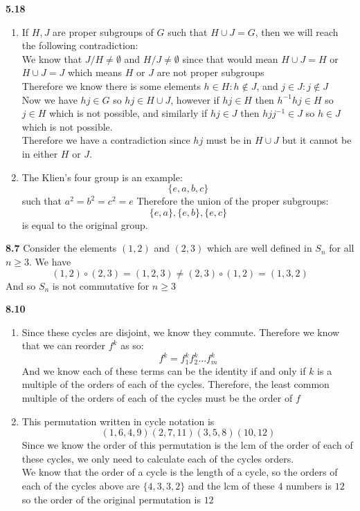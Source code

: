 \documentclass[12pt]{article}
\newenvironment{ques}{\vspace{2 ex}}{\vspace{2 ex}}
\theoremstyle{definition}
\begin{document}
\begin{ques}
	\textbf{5.18} 
		\begin{enumerate}
			\item If $H,J$ are proper subgroups of $G$ such that $H
				\cup J = G$, then we will reach the following
				contradiction:\\
				We know that $J / H \neq \emptyset$ and $H/J
				\neq \emptyset$ since that would mean $H \cup J
				= H$ or $H \cup J = J$ which means $H$ or $J$
				are not proper subgroups\\
				Therefore we know there is some elements $h \in
				H: h \notin J$, and $j \in J: j \notin J$\\
				Now we have $hj \in G$ so $hj \in H \cup J$,
				however if $hj \in H$ then $h^{-1}hj \in H$ so
				$j \in H$ which is not possible, and similarly
				if $hj \in J$ then $hjj^{-1} \in J$ so $h \in
				J$ which is not possible.\\
				Therefore we have a contradiction since $hj$
				must be in $H \cup J$ but it cannot be in
				either $H$ or $J$.

			\item The Klien's four group is an example:
				$$\{e, a, b, c\}$$
				such that $a^2 = b^2 = c^2 = e$
				Therefore the union of the proper subgroups:
				$$\{e, a\}, \{e, b\}, \{e, c\}$$
				is equal to the original group.
		\end{enumerate}
\end{ques}

\begin{ques}
	\textbf{8.7} Consider the elements $(1,2)$ and $(2,3)$ which are well
		defined in $S_n$ for all $n \geq 3$. We have
		$$(1,2) \circ (2,3) = (1,2,3) \neq (2,3) \circ (1,2) = (1,3,2)$$
		And so $S_n$ is not commutative for $n \geq 3$
\end{ques}

\begin{ques}
	\textbf{8.10} 
		\begin{enumerate} 
			\item Since these cycles are disjoint, we know they
				commute. Therefore we know that we can reorder
				$f^k$ as so:
				$$f^k = f_1^kf_2^k\dots f_m^k$$
				And we know each of these terms can be the
				identity if and only if $k$ is a multiple of
				the orders of each of the cycles. Therefore,
				the least common multiple of the orders of each
				of the cycles must be the order of $f$
				
			\item This permutation written in cycle notation is
				$$(1, 6, 4, 9)(2, 7, 11)(3, 5, 8)(10, 12)$$
				Since we know the order of this permutation is
				the lcm of the order of each of these cycles,
				we only need to calculate each of the cycles
				orders.\\
				We know that the order of a cycle is the length
				of a cycle, so the orders of each of the cycles
				above are $\{4, 3, 3, 2\}$ and the lcm of these
				4 numbers is $12$ so the order of the original
				permutation is $12$
		\end{enumerate}
\end{ques}
\end{document}
